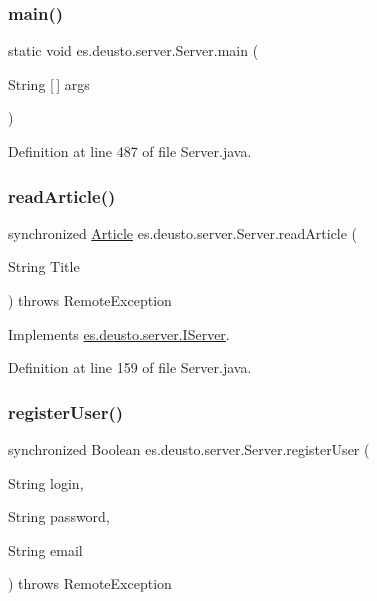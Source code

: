 \subsubsection{\texorpdfstring{main()}{main()}}
{\footnotesize\ttfamily static void es.\+deusto.\+server.\+Server.\+main (\begin{DoxyParamCaption}\item[{String \mbox{[}$\,$\mbox{]}}]{args }\end{DoxyParamCaption})\hspace{0.3cm}{\ttfamily [static]}}



Definition at line 487 of file Server.\+java.

\mbox{\label{classes_1_1deusto_1_1server_1_1_server_ac3af6f09e37d0b86743f8f46e39acdad}} 
\subsubsection{\texorpdfstring{read\+Article()}{readArticle()}}
{\footnotesize\ttfamily synchronized \hyperlink{classes_1_1deusto_1_1server_1_1jdo_1_1_article}{Article} es.\+deusto.\+server.\+Server.\+read\+Article (\begin{DoxyParamCaption}\item[{String}]{Title }\end{DoxyParamCaption}) throws Remote\+Exception}



Implements \hyperlink{interfacees_1_1deusto_1_1server_1_1_i_server_a1f02a5aa0628909b5464141923f5d1d2}{es.\+deusto.\+server.\+I\+Server}.



Definition at line 159 of file Server.\+java.

\mbox{\label{classes_1_1deusto_1_1server_1_1_server_a0ab63e5bc49a52ff84f7d6859161b683}} 
\subsubsection{\texorpdfstring{register\+User()}{registerUser()}}
{\footnotesize\ttfamily synchronized Boolean es.\+deusto.\+server.\+Server.\+register\+User (\begin{DoxyParamCaption}\item[{String}]{login,  }\item[{String}]{password,  }\item[{String}]{email }\end{DoxyParamCaption}) throws Remote\+Exception}

